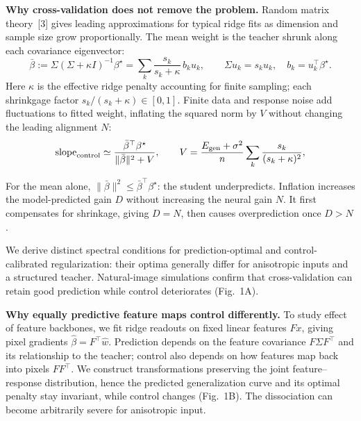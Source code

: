 \documentclass[12pt,a4paper]{article}
\newcommand{\head}[1]{\par\noindent\textbf{#1}\enspace\ignorespaces}
\newcommand{\bh}{\hat\beta}
\newcommand{\bt}{\beta^\star}
\newcommand{\mb}{\bar\beta}
\begin{document}
\head{Why cross-validation does not remove the problem.}
Random matrix theory~[3] gives leading approximations for typical ridge fits as dimension and sample size grow proportionally. The mean weight is the teacher shrunk along each covariance eigenvector:
\begin{equation}
\mb:=\Sigma(\Sigma+\kappa I)^{-1}\bt
=\sum_k\frac{s_k}{s_k+\kappa}\,b_k u_k,
\qquad \Sigma u_k=s_k u_k,\quad b_k=u_k^\top\bt.
\label{eq:mean-shrinkage}
\end{equation}
Here $\kappa$ is the effective ridge penalty accounting for finite sampling; each shrinkgage factor $s_k/(s_k+\kappa)\in[0,1]$.%
Finite data and response noise add fluctuations to fitted weight, inflating the squared norm by $V$ without changing the leading alignment $N$:
\begin{equation}
\mathrm{slope}_{\rm control}\simeq
\frac{\mb^\top\bt}{\|\mb\|^2+V},
\qquad
V=\frac{E_{\rm gen}+\sigma^2}{n}
\sum_k\frac{s_k}{(s_k+\kappa)^2},
\label{eq:inflation}
\end{equation}
\begin{samepage}
For the mean alone, $\|\mb\|^2\le\mb^\top\bt$: the student underpredicts. Inflation increases the model-predicted gain $D$ without increasing the neural gain $N$. It first compensates for shrinkage, giving $D=N$, then causes overprediction once $D>N$.\par
\end{samepage}
\begin{samepage}
We derive distinct spectral conditions for prediction-optimal and control-calibrated regularization: their optima generally differ for anisotropic inputs and a structured teacher. Natural-image simulations confirm that cross-validation can retain good prediction while control deteriorates (Fig.~1A).\par
\end{samepage}

\head{Why equally predictive feature maps control differently.}
To study effect of feature backbones, we fit ridge readouts on fixed linear features $Fx$, giving pixel gradients $\bh=F^\top\hat w$. Prediction depends on the feature covariance $F\Sigma F^\top$ and its relationship to the teacher; control also depends on how features map back into pixels $FF^\top$. We construct transformations preserving the joint feature--response distribution, hence the predicted generalization curve and its optimal penalty stay invariant, while control changes (Fig.~1B). The dissociation can become arbitrarily severe for anisotropic input.
\end{document}
